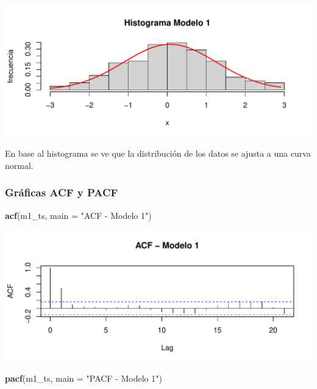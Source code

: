 \documentclass[
  11pt,
]{article}
\newenvironment{Shaded}{\begin{snugshade}}{\end{snugshade}}
\newcommand{\DataTypeTok}[1]{\textcolor[rgb]{0.13,0.29,0.53}{#1}}
\newcommand{\KeywordTok}[1]{\textcolor[rgb]{0.13,0.29,0.53}{\textbf{#1}}}
\newcommand{\NormalTok}[1]{#1}
\newcommand{\StringTok}[1]{\textcolor[rgb]{0.31,0.60,0.02}{#1}}
\begin{document}
\begin{center}\includegraphics[width=0.9\linewidth]{RmdFigs/histograma_m1-1} \end{center}

En base al histograma se ve que la distribución de los datos se ajusta a
una curva normal.

\hypertarget{gruxe1ficas-acf-y-pacf}{%
\subsubsection{Gráficas ACF y PACF}\label{gruxe1ficas-acf-y-pacf}}

\begin{Shaded}
\begin{Highlighting}[]
\KeywordTok{acf}\NormalTok{(m1_ts, }\DataTypeTok{main =} \StringTok{"ACF - Modelo 1"}\NormalTok{)}
\end{Highlighting}
\end{Shaded}

\begin{center}\includegraphics[width=0.9\linewidth]{RmdFigs/acfM1-1} \end{center}

\begin{Shaded}
\begin{Highlighting}[]
\KeywordTok{pacf}\NormalTok{(m1_ts, }\DataTypeTok{main =} \StringTok{"PACF - Modelo 1"}\NormalTok{)}
\end{Highlighting}
\end{Shaded}
\end{document}
